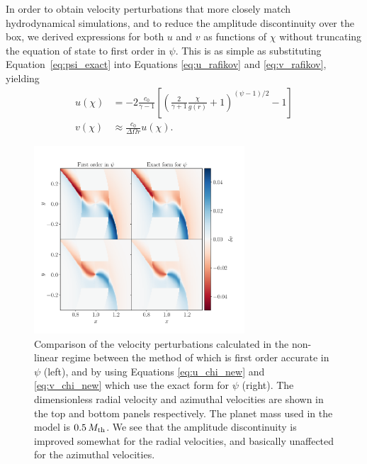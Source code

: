 In order to obtain velocity perturbations that more closely match hydrodynamical simulations, and to reduce the amplitude discontinuity over the box, we derived expressions for both $u$ and $v$ as functions of $\chi$ without truncating the equation of state to first order in $\psi$. 
This is as simple as substituting Equation~\eqref{eq:psi_exact} into Equations \eqref{eq:u_rafikov} and \eqref{eq:v_rafikov}, yielding
\begin{align}
    u(\chi) &= -2 \frac{c_0}{\gamma - 1} \left[ \left( \frac{2}{\gamma + 1} \frac{\chi}{g(r)} +1  \right)^{(\psi-1)/2} -1 \right] \label{eq:u_chi_new} \\
    v(\chi) &\approx \frac{c_0}{\Delta\Omega r} u (\chi). \label{eq:v_chi_new} 
\end{align}
\begin{figure}
    \centering
    \includegraphics[width = 0.7\textwidth]{figures/0_5_mth.pdf}
    \caption{Comparison of the velocity perturbations calculated in the non-linear regime between the method of \citet{bollati2021} which is first order accurate in $\psi$ (left), and by using Equations \eqref{eq:u_chi_new} and \eqref{eq:v_chi_new} which use the exact form for $\psi$ (right). The dimensionless radial velocity and azimuthal velocities are shown in the top and bottom panels respectively. The planet mass used in the model is $0.5 \, M_{\rm th}$. We see that the amplitude discontinuity is improved somewhat for the radial velocities, and basically unaffected for the azimuthal velocities.}
    \label{fig:0_5mth}
\end{figure}
